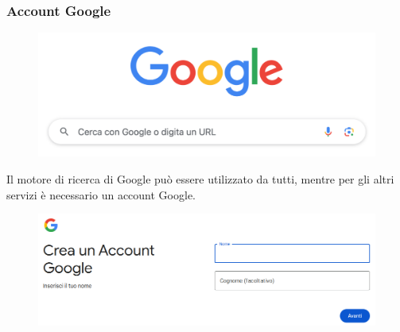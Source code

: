 \documentclass[handout]{beamer}
\begin{document}
\begin{frame}
\frametitle{Account Google}
\begin{figure}
  \includegraphics[width=.5\columnwidth]{img/googlesearch.png}
\end{figure}
Il \alert{motore di ricerca} di Google può essere utilizzato da tutti, mentre per gli altri servizi è necessario un \alert{account Google}.

\begin{figure}
  \includegraphics[width=.8\columnwidth]{img/accountgoogle.png}
\end{figure}
\end{frame}
\end{document}
